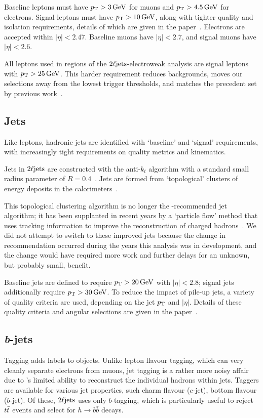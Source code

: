 Baseline leptons must have $\pt > 3\,\eV[G]$ for muons and
$\pt > 4.5\,\eV[G]$ for electrons.
Signal leptons must have $\pt > 10\,\eV[G]$, along with tighter
quality and isolation requirements, details of which are given in the
paper~\cite{atlas2022searches}.
Electrons are accepted within $|\eta| < 2.47$.
Baseline muons have $|\eta| < 2.7$, and signal muons have $|\eta| < 2.6$.

All leptons used in regions of the $\twoljets$-electroweak analysis are signal
leptons with $\pt > 25\,\eV[G]$.
This harder requirement reduces backgrounds, moves our selections away from the
lowest trigger thresholds, and matches the precedent set by previous
work~\cite{atlas_23l_SUSY_2016_24}.


\subsection{Jets}
Like leptons, hadronic jets are identified with `baseline' and `signal'
requirements, with increasingly tight requirements on quality metrics and
kinematics.

Jets in $\twoljets$ are constructed with the anti-$k_t$ algorithm with a
standard small radius parameter of $R=0.4$~\cite{jet_anti_kt}.
Jets are formed from `topological' clusters of energy deposits in the
calorimeters~\cite{atlas_jet_topo_PERF_2014_07}.

This topological clustering algorithm is no longer the \atlas-recommended jet
algorithm; it has been supplanted in recent years by a `particle flow' method
that uses tracking information to improve the reconstruction of charged
hadrons~\cite{atlas_jet_pflow_PERF_2015_09}.
We did not attempt to switch to these improved jets because the change in
recommendation occurred during the years this analysis was in development, and
the change would have required more work and further delays for an unknown,
but probably small, benefit.

Baseline jets are defined to require $\pt > 20\,\eV[G]$ with $|\eta| < 2.8$;
signal jets additionally require $\pt > 30\,\eV[G]$.
To reduce the impact of pile-up jets, a variety of quality criteria are used,
depending on the jet $\pt$ and $|\eta|$.
Details of these quality criteria and angular selections are given in the
paper~\cite{atlas2022searches}.


\subsection{\textit{b}-jets}
\label{sec:2ljets_btagging}
Tagging adds labels to objects.
Unlike lepton flavour tagging, which can very cleanly separate electrons from
muons, jet tagging is a rather more noisy affair due to \atlas's limited
ability to reconstruct the individual hadrons within jets.
Taggers are available for various jet properties, such charm flavour ($c$-jet),
bottom flavour ($b$-jet).
Of these, $\twoljets$ uses only $b$-tagging, which is particularly useful to
reject $\ttbar$ events and select for $h\to b\bar b$ decays.

